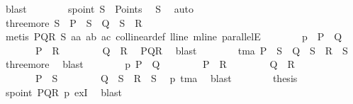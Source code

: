 \begin{isabellebody}
\ blast\isanewline
\ \ \ \ \ \ \isamarkupfalse%
\ spoint{\isacharcolon}{\kern0pt}\ {\isachardoublequoteopen}S\ {\isasymin}\ Points{\isachardoublequoteclose}\ \isamarkupfalse%
\ S\ \isamarkupfalse%
\ auto\ \isanewline
\ \ \ \ \ \ \isamarkupfalse%
\ three{\isacharunderscore}{\kern0pt}more{\isacharcolon}{\kern0pt}\ {\isachardoublequoteopen}S\ {\isasymnoteq}\ P\ {\isasymand}\ S\ {\isasymnoteq}\ Q\ {\isasymand}\ S\ {\isasymnoteq}\ R{\isachardoublequoteclose}\isanewline
\ \ \ \ \ \ \ \ \isamarkupfalse%
\ {\isacharparenleft}{\kern0pt}metis\ PQR\ S\ a{}a\ a{}b\ a{}c\ collinear{\isacharunderscore}{\kern0pt}def\ lline\ mline\ parallelE{\isacharparenright}{\kern0pt}\isanewline
\ \ \ \ \ \ \isamarkupfalse%
\ p{}{\isacharcolon}{\kern0pt}\ {\isachardoublequoteopen}\ P\ {\isasymnoteq}\ Q\ {\isasymand}\isanewline
\ \ \ \ \ \ \ P\ {\isasymnoteq}\ R\ {\isasymand}\isanewline
\ \ \ \ \ \ \ Q\ {\isasymnoteq}\ R{\isachardoublequoteclose}\ \isamarkupfalse%
\ PQR\ \isamarkupfalse%
\ blast\isanewline
\ \ \ \ \ \ \isamarkupfalse%
\ tma{\isacharcolon}{\kern0pt}\ {\isachardoublequoteopen}P\ {\isasymnoteq}\ S\ {\isasymand}\ Q\ {\isasymnoteq}\ S\ {\isasymand}\ R\ {\isasymnoteq}\ S{\isachardoublequoteclose}\ \isamarkupfalse%
\ three{\isacharunderscore}{\kern0pt}more\ \isamarkupfalse%
\ blast\isanewline
\ \ \ \ \ \ \isamarkupfalse%
\ p{}{\isacharcolon}{\kern0pt}\ {\isachardoublequoteopen}P\ {\isasymnoteq}\ Q\ {\isasymand}\isanewline
\ \ \ \ \ \ \ P\ {\isasymnoteq}\ R\ {\isasymand}\isanewline
\ \ \ \ \ \ \ Q\ {\isasymnoteq}\ R\ {\isasymand}\isanewline
\ \ \ \ \ \ \ P\ {\isasymnoteq}\ S\ {\isasymand}\isanewline
\ \ \ \ \ \ \ Q\ {\isasymnoteq}\ S\ {\isasymand}\ R\ {\isasymnoteq}\ S{\isachardoublequoteclose}\ \isamarkupfalse%
\ p{}\ tma\ \isamarkupfalse%
\ blast\isanewline
\ \ \ \ \ \ \isamarkupfalse%
\ {\isacharquery}{\kern0pt}thesis\isanewline
\ \ \ \ \ \ \ \ \isamarkupfalse%
\ spoint\ PQR\ p{}\ exI\ \isamarkupfalse%
\ blast\isanewline
\ \ \ \ \isamarkupfalse%
%
\endisatagproof
{\isafoldproof}%
%
\isadelimproof
%
\endisadelimproof
%
\begin{isamarkuptext}%
\done \done%
\end{isamarkuptext}\isamarkuptrue%

\end{isabellebody}
